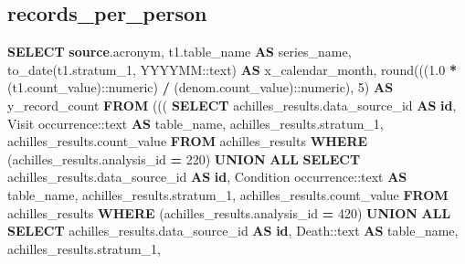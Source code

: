 \documentclass[
]{book}
\newenvironment{Shaded}{\begin{snugshade}}{\end{snugshade}}
\newcommand{\CharTok}[1]{\textcolor[rgb]{0.31,0.60,0.02}{#1}}
\newcommand{\DecValTok}[1]{\textcolor[rgb]{0.00,0.00,0.81}{#1}}
\newcommand{\FloatTok}[1]{\textcolor[rgb]{0.00,0.00,0.81}{#1}}
\newcommand{\FunctionTok}[1]{\textcolor[rgb]{0.00,0.00,0.00}{#1}}
\newcommand{\KeywordTok}[1]{\textcolor[rgb]{0.13,0.29,0.53}{\textbf{#1}}}
\newcommand{\NormalTok}[1]{#1}
\newcommand{\OperatorTok}[1]{\textcolor[rgb]{0.81,0.36,0.00}{\textbf{#1}}}
\newcommand{\StringTok}[1]{\textcolor[rgb]{0.31,0.60,0.02}{#1}}
\begin{document}
\hypertarget{records_per_person}{%
\subsection*{records\_per\_person}\label{records_per_person}}

\begin{Shaded}
\begin{Highlighting}[]
\KeywordTok{SELECT} \KeywordTok{source}\NormalTok{.acronym,}
\NormalTok{   t1.table\_name }\KeywordTok{AS}\NormalTok{ series\_name,}
   \FunctionTok{to\_date}\NormalTok{(t1.stratum\_1, }\StringTok{\textquotesingle{}YYYYMM\textquotesingle{}}\NormalTok{:}\CharTok{:text}\NormalTok{) }\KeywordTok{AS}\NormalTok{ x\_calendar\_month,}
   \FunctionTok{round}\NormalTok{(((}\FloatTok{1.0} \OperatorTok{*}\NormalTok{ (t1.count\_value):}\CharTok{:numeric}\NormalTok{) }\OperatorTok{/}\NormalTok{ (denom.count\_value):}\CharTok{:numeric}\NormalTok{), }\DecValTok{5}\NormalTok{) }\KeywordTok{AS}\NormalTok{ y\_record\_count}
  \KeywordTok{FROM}\NormalTok{ ((( }\KeywordTok{SELECT}\NormalTok{ achilles\_results.data\_source\_id }\KeywordTok{AS} \KeywordTok{id}\NormalTok{,}
           \StringTok{\textquotesingle{}Visit occurrence\textquotesingle{}}\NormalTok{:}\CharTok{:text} \KeywordTok{AS}\NormalTok{ table\_name,}
\NormalTok{           achilles\_results.stratum\_1,}
\NormalTok{           achilles\_results.count\_value}
          \KeywordTok{FROM}\NormalTok{ achilles\_results}
         \KeywordTok{WHERE}\NormalTok{ (achilles\_results.analysis\_id }\OperatorTok{=} \DecValTok{220}\NormalTok{)}
       \KeywordTok{UNION} \KeywordTok{ALL}
        \KeywordTok{SELECT}\NormalTok{ achilles\_results.data\_source\_id }\KeywordTok{AS} \KeywordTok{id}\NormalTok{,}
           \StringTok{\textquotesingle{}Condition occurrence\textquotesingle{}}\NormalTok{:}\CharTok{:text} \KeywordTok{AS}\NormalTok{ table\_name,}
\NormalTok{           achilles\_results.stratum\_1,}
\NormalTok{           achilles\_results.count\_value}
          \KeywordTok{FROM}\NormalTok{ achilles\_results}
         \KeywordTok{WHERE}\NormalTok{ (achilles\_results.analysis\_id }\OperatorTok{=} \DecValTok{420}\NormalTok{)}
       \KeywordTok{UNION} \KeywordTok{ALL}
        \KeywordTok{SELECT}\NormalTok{ achilles\_results.data\_source\_id }\KeywordTok{AS} \KeywordTok{id}\NormalTok{,}
           \StringTok{\textquotesingle{}Death\textquotesingle{}}\NormalTok{:}\CharTok{:text} \KeywordTok{AS}\NormalTok{ table\_name,}
\NormalTok{           achilles\_results.stratum\_1,}

\end{Highlighting}
\end{Shaded}
\end{document}
